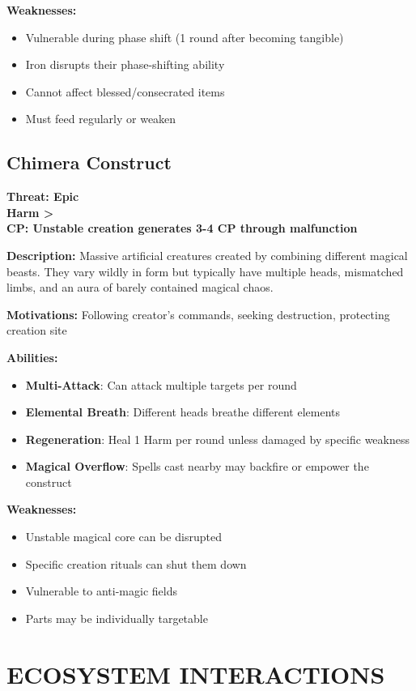 \documentclass[12pt]{article}
\newcommand{\cp}[1]{\textbf{CP: #1}}
\newcommand{\harm}[1]{\textbf{Harm #1}}
\newcommand{\threat}[1]{\textbf{Threat: #1}}
\begin{document}
\begin{itemize}
\textbf{Weaknesses:}
\begin{itemize}
\item Vulnerable during phase shift (1 round after becoming tangible)
\item Iron disrupts their phase-shifting ability
\item Cannot affect blessed/consecrated items
\item Must feed regularly or weaken
\end{itemize}

\subsection*{Chimera Construct}

\threat{Epic} \\
\harm{>} \\
\cp{Unstable creation generates 3-4 CP through malfunction}

\vspace{0.5em}
\textbf{Description:} Massive artificial creatures created by combining different magical beasts. They vary wildly in form but typically have multiple heads, mismatched limbs, and an aura of barely contained magical chaos.

\textbf{Motivations:} Following creator's commands, seeking destruction, protecting creation site

\textbf{Abilities:}
\begin{itemize}
\item \textbf{Multi-Attack}: Can attack multiple targets per round
\item \textbf{Elemental Breath}: Different heads breathe different elements
\item \textbf{Regeneration}: Heal 1 Harm per round unless damaged by specific weakness
\item \textbf{Magical Overflow}: Spells cast nearby may backfire or empower the construct
\end{itemize}

\textbf{Weaknesses:}
\begin{itemize}
\item Unstable magical core can be disrupted
\item Specific creation rituals can shut them down
\item Vulnerable to anti-magic fields
\item Parts may be individually targetable
\end{itemize}

\section{ECOSYSTEM INTERACTIONS}


\end{itemize}
\end{document}
